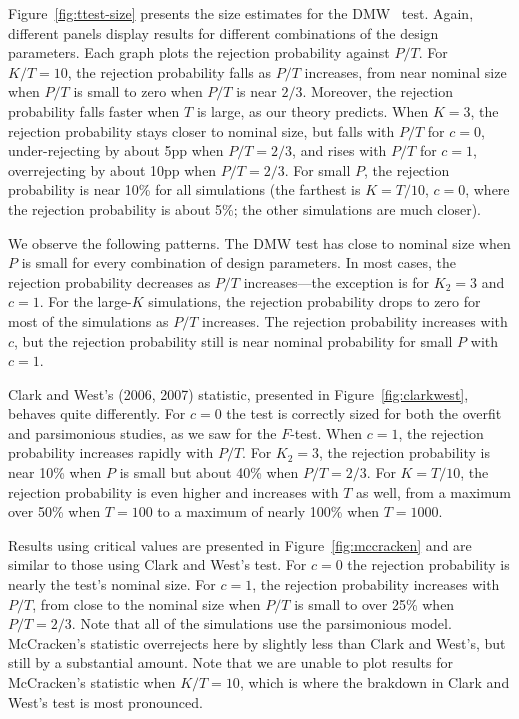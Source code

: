 \documentclass[12pt]{article}
\begin{document}
Figure~\ref{fig:ttest-size} presents the size estimates for the DMW
\oost\ test.  Again, different panels display results for different
combinations of the design parameters.  Each graph plots the rejection
probability against $P/T$.  For $K/T=10$, the rejection probability
falls as $P/T$ increases, from near nominal size when $P/T$ is small
to zero when $P/T$ is near $2/3$.  Moreover, the rejection probability
falls faster when $T$ is large, as our theory predicts.  When $K=3$,
the rejection probability stays closer to nominal size, but falls with
$P/T$ for $c=0$, under-rejecting by about 5pp when $P/T = 2/3$, and
rises with $P/T$ for $c=1$, overrejecting by about 10pp when
$P/T=2/3$.  For small $P$, the rejection probability is near 10\% for
all simulations (the farthest is $K=T/10$, $c=0$, where the rejection
probability is about 5\%; the other simulations are much closer).

We observe the following patterns.  The
DMW test has close to nominal size when $P$ is small for every
combination of design parameters.  In most cases, the rejection
probability decreases as $P/T$ increases---the exception is for $K_2 =
3$ and $c=1$.  For the large-$K$ simulations, the rejection
probability drops to zero for most of the simulations as $P/T$
increases.  The rejection probability increases with $c$, but the
rejection probability still is near nominal probability for small $P$
with $c=1$.

Clark and West's (2006, 2007) statistic, presented in
Figure~\ref{fig:clarkwest}, behaves quite differently.  For $c=0$ the
test is correctly sized for both the overfit and parsimonious studies,
as we saw for the $F$-test.  When $c=1$, the rejection probability
increases rapidly with $P/T$.  For $K_2=3$, the rejection probability
is near 10\% when $P$ is small but about 40\% when $P/T = 2/3$.  For
$K=T/10$, the rejection probability is even higher and increases with
$T$ as well, from a maximum over 50\% when $T=100$ to a maximum of
nearly 100\% when $T=1000$.

Results using  critical values are presented in
Figure~\ref{fig:mccracken} and are similar to those using Clark and
West's test.  For $c=0$ the rejection probability is nearly the test's
nominal size.  For $c=1$, the rejection probability increases with
$P/T$, from close to the nominal size when $P/T$ is small to over 25\%
when $P/T = 2/3$.  Note that all of the simulations use the
parsimonious model.  McCracken's statistic overrejects here by
slightly less than Clark and West's, but still by a substantial
amount. Note that we are unable to plot results for McCracken's
statistic when $K/T = 10$, which is where the brakdown in Clark and
West's test is most pronounced.
\end{document}
